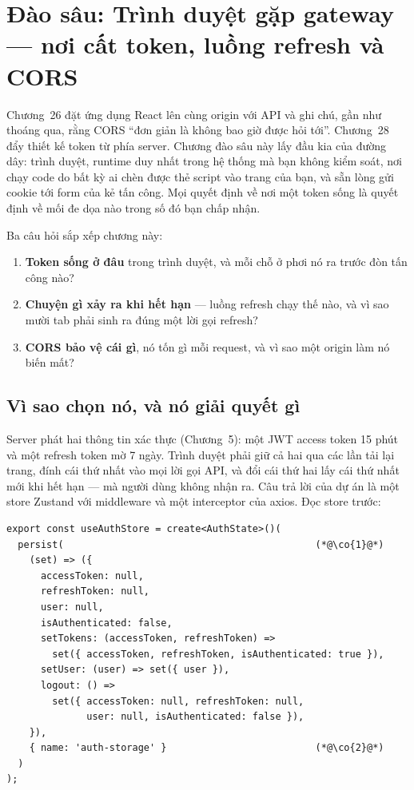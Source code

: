 \chapter{Đào sâu: Trình duyệt gặp gateway --- nơi cất token, luồng refresh và CORS}
\label{ch:dd-frontend-auth}

Chương~26 đặt ứng dụng React lên cùng origin với API và ghi chú, gần
như thoáng qua, rằng CORS ``đơn giản là không bao giờ được hỏi tới''.
Chương~28 đẩy thiết kế token từ phía server. Chương đào sâu này lấy đầu
kia của đường dây: trình duyệt, runtime duy nhất trong hệ thống mà bạn
không kiểm soát, nơi chạy code do bất kỳ ai chèn được thẻ script vào
trang của bạn, và sẵn lòng gửi cookie tới form của kẻ tấn công. Mọi
quyết định về nơi một token sống là quyết định về mối đe dọa nào trong
số đó bạn chấp nhận.

Ba câu hỏi sắp xếp chương này:

\begin{enumerate}
  \item \textbf{Token sống ở đâu} trong trình duyệt, và mỗi chỗ ở
  phơi nó ra trước đòn tấn công nào?
  \item \textbf{Chuyện gì xảy ra khi hết hạn} --- luồng refresh chạy
  thế nào, và vì sao mười tab phải sinh ra đúng một lời gọi refresh?
  \item \textbf{CORS bảo vệ cái gì}, nó tốn gì mỗi request, và vì sao
  một origin làm nó biến mất?
\end{enumerate}

\section{Vì sao chọn nó, và nó giải quyết gì}

Server phát hai thông tin xác thực (Chương~5): một JWT access token 15
phút và một refresh token mờ 7 ngày. Trình duyệt phải giữ cả hai qua
các lần tải lại trang, đính cái thứ nhất vào mọi lời gọi API, và đổi
cái thứ hai lấy cái thứ nhất mới khi hết hạn --- mà người dùng không
nhận ra. Câu trả lời của dự án là một store Zustand với middleware
 và một interceptor của axios. Đọc store trước:

\begin{lstlisting}
export const useAuthStore = create<AuthState>()(
  persist(                                            (*@\co{1}@*)
    (set) => ({
      accessToken: null,
      refreshToken: null,
      user: null,
      isAuthenticated: false,
      setTokens: (accessToken, refreshToken) =>
        set({ accessToken, refreshToken, isAuthenticated: true }),
      setUser: (user) => set({ user }),
      logout: () =>
        set({ accessToken: null, refreshToken: null,
              user: null, isAuthenticated: false }),
    }),
    { name: 'auth-storage' }                          (*@\co{2}@*)
  )
);
\end{lstlisting}

